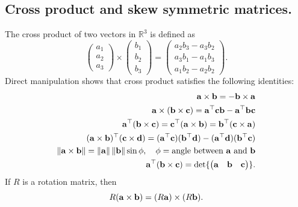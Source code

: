 \subsection{Cross product and skew symmetric matrices.}
The cross product of two vectors in $\mathbb{R}^3$ is defined as
\[
\begin{pmatrix} a_1 \\ a_2 \\ a_3 \end{pmatrix} \times \begin{pmatrix} b_1 \\ b_2 \\ b_3 \end{pmatrix} = \begin{pmatrix} a_2 b_3 - a_3 b_2 \\ a_3 b_1 - a_1 b_3 \\ a_1 b_2 - a_2 b_2 \end{pmatrix}.
\]
Direct manipulation shows that cross product satisfies the following identities:
\begin{align}
\abf \times \bbf = -\bbf \times \abf \label{eq:cross_product_1} \\
\abf \times (\bbf \times \cbf) = \abf^\top \cbf \bbf - \abf^\top\bbf \cbf \label{eq:cross_product_2} \\
\abf^\top(\bbf\times\cbf)=\cbf^\top(\abf\times\bbf)=\bbf^\top(\cbf\times\abf) \label{eq:cross_product_3} \\
(\abf\times\bbf)^\top(\cbf\times\dbf) = (\abf^\top\cbf)(\bbf^\top\dbf)-(\abf^\top\dbf)(\bbf^\top\cbf) \label{eq:cross_product_4} \\
\norm{\abf \times \bbf} = \norm{\abf}\norm{\bbf}\sin\phi, \quad \phi=\text{angle between $\abf$ and $\bbf$}\label{eq:cross_product_5} \\
\abf^\top (\bbf\times\cbf) = \text{det}\{\begin{pmatrix}\abf & \bbf & \cbf\end{pmatrix}\}. \label{eq:cross_product_6}
\end{align}
If $R$ is a rotation matrix, then 
\begin{equation} \label{eq:cross_product_7}
R(\abf\times\bbf) = (R\abf)\times(R\bbf).	
\end{equation}


